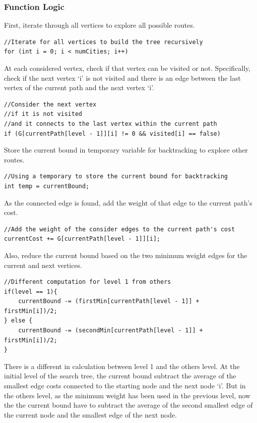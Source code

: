 \documentclass[a4paper]{article}
\begin{document}
\subsubsection{Function Logic}
First, iterate through all vertices to explore all possible routes.
\begin{verbatim}
//Iterate for all vertices to build the tree recursively
for (int i = 0; i < numCities; i++)
\end{verbatim}
At each considered vertex, check if that vertex can be visited or not. Specifically, check if the next vertex `i' is not visited and there is an edge between the last vertex of the current path and the next vertex `i'.
\begin{verbatim}
//Consider the next vertex 
//if it is not visited 
//and it connects to the last vertex within the current path
if (G[currentPath[level - 1]][i] != 0 && visited[i] == false)
\end{verbatim}
Store the current bound in temporary variable for backtracking to explore other routes.
\begin{verbatim}
//Using a temporary to store the current bound for backtracking
int temp = currentBound;
\end{verbatim}
As the connected edge is found, add the weight of that edge to the current path's cost.
\begin{verbatim}
//Add the weight of the consider edges to the current path's cost
currentCost += G[currentPath[level - 1]][i];
\end{verbatim}
Also, reduce the current bound based on the two minimum weight edges for the current and next vertices. 
\begin{verbatim}
//Different computation for level 1 from others
if(level == 1){
    currentBound -= (firstMin[currentPath[level - 1]] + firstMin[i])/2;
} else {
    currentBound -= (secondMin[currentPath[level - 1]] + firstMin[i])/2;
}
\end{verbatim}
There is a different in calculation between level 1 and the others level. At the initial level of the search tree, the current bound subtract the average of the smallest edge costs connected to the starting node and the next node `i'. But in the others level, as the minimum weight has been used in the previous level, now the the current bound have to subtract the average of the second smallest edge of the current node and the smallest edge of the next node. \\ \\
\end{document}
